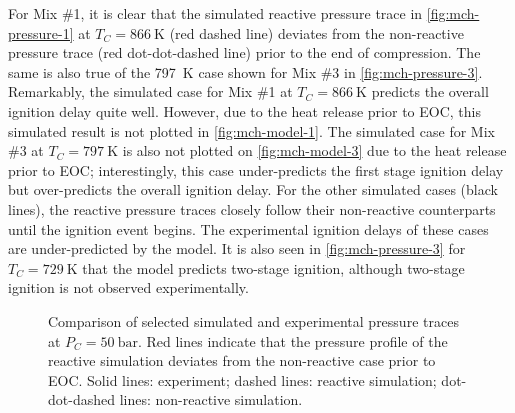 \documentclass[12pt, letterpaper]{article}
\begin{document}
For Mix \#1, it is clear that the simulated reactive pressure trace in
\autoref{fig:mch-pressure-1} at $T_C=\SI{866}{\kelvin}$ (red dashed line) deviates from
the non-reactive pressure trace (red dot-dot-dashed line) prior to the end of
compression. The same is also true of the \SI{797}{\kelvin} case shown for Mix \#3 in
\autoref{fig:mch-pressure-3}. Remarkably, the simulated case for Mix \#1 at
$T_C=\SI{866}{\kelvin}$ predicts the overall ignition delay quite well. However, due to the
heat release prior to EOC, this simulated result is not plotted in
\autoref{fig:mch-model-1}. The simulated case for Mix \#3 at $T_C=\SI{797}{\kelvin}$ is also
not plotted on \autoref{fig:mch-model-3} due to the heat release prior to EOC;
interestingly, this case under-predicts the first stage ignition delay but
over-predicts the overall ignition delay. For the other simulated cases (black
lines), the reactive pressure traces closely follow their non-reactive
counterparts until the ignition event begins. The experimental ignition delays
of these cases are under-predicted by the model. It is also seen in
\autoref{fig:mch-pressure-3} for $T_C=\SI{729}{\kelvin}$ that the model predicts two-stage
ignition, although two-stage ignition is not observed experimentally.

\begin{figure}
    {\caption{Comparison of selected simulated and experimental pressure traces
        at $P_C=\SI{50}{\bar}$. Red lines
        indicate that the pressure profile of the reactive simulation deviates
        from the non-reactive case prior to EOC. Solid lines: experiment;
        dashed lines: reactive simulation; dot-dot-dashed lines: non-reactive
        simulation.}
    \label{fig:mch-pressure}}
\end{figure}
\end{document}
